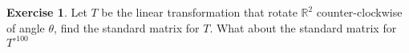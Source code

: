 \documentclass{beamer}
\theoremstyle{definition}
\newtheorem{exercise}[theorem]{Exercise}
\theoremstyle{remark}
\begin{document}
\begin{frame}[t]
\begin{exercise}
Let $T$ be the linear transformation that rotate $\mathbb R^2$ counter-clockwise of angle $\theta$, find the standard matrix for $T$. What about the standard matrix for $T^{\circ100}$
\end{exercise}
\end{frame}




\end{document}
